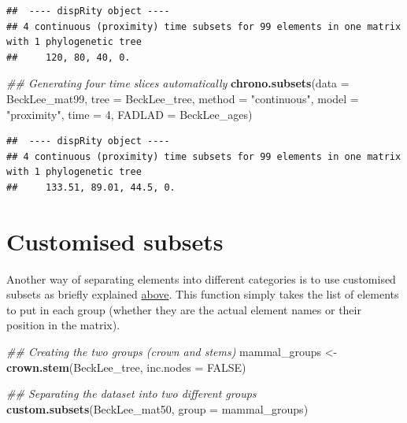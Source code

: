 \documentclass[
]{book}
\newenvironment{Shaded}{\begin{snugshade}}{\end{snugshade}}
\newcommand{\CommentTok}[1]{\textcolor[rgb]{0.56,0.35,0.01}{\textit{#1}}}
\newcommand{\DataTypeTok}[1]{\textcolor[rgb]{0.13,0.29,0.53}{#1}}
\newcommand{\DecValTok}[1]{\textcolor[rgb]{0.00,0.00,0.81}{#1}}
\newcommand{\KeywordTok}[1]{\textcolor[rgb]{0.13,0.29,0.53}{\textbf{#1}}}
\newcommand{\NormalTok}[1]{#1}
\newcommand{\OtherTok}[1]{\textcolor[rgb]{0.56,0.35,0.01}{#1}}
\newcommand{\StringTok}[1]{\textcolor[rgb]{0.31,0.60,0.02}{#1}}
\begin{document}
\begin{verbatim}
##  ---- dispRity object ---- 
## 4 continuous (proximity) time subsets for 99 elements in one matrix with 1 phylogenetic tree
##     120, 80, 40, 0.
\end{verbatim}

\begin{Shaded}
\begin{Highlighting}[]
\CommentTok{\#\# Generating four time slices automatically}
\KeywordTok{chrono.subsets}\NormalTok{(}\DataTypeTok{data =}\NormalTok{ BeckLee\_mat99, }\DataTypeTok{tree =}\NormalTok{ BeckLee\_tree,}
               \DataTypeTok{method =} \StringTok{"continuous"}\NormalTok{, }\DataTypeTok{model =} \StringTok{"proximity"}\NormalTok{,}
               \DataTypeTok{time =} \DecValTok{4}\NormalTok{, }\DataTypeTok{FADLAD =}\NormalTok{ BeckLee\_ages)}
\end{Highlighting}
\end{Shaded}

\begin{verbatim}
##  ---- dispRity object ---- 
## 4 continuous (proximity) time subsets for 99 elements in one matrix with 1 phylogenetic tree
##     133.51, 89.01, 44.5, 0.
\end{verbatim}

\hypertarget{custom-subsets}{%
\section{Customised subsets}\label{custom-subsets}}

Another way of separating elements into different categories is to use customised subsets as briefly explained \protect\hyperlink{disparity-among-groups}{above}.
This function simply takes the list of elements to put in each group (whether they are the actual element names or their position in the matrix).

\begin{Shaded}
\begin{Highlighting}[]
\CommentTok{\#\# Creating the two groups (crown and stems)}
\NormalTok{mammal\_groups \textless{}{-}}\StringTok{ }\KeywordTok{crown.stem}\NormalTok{(BeckLee\_tree, }\DataTypeTok{inc.nodes =} \OtherTok{FALSE}\NormalTok{)}

\CommentTok{\#\# Separating the dataset into two different groups}
\KeywordTok{custom.subsets}\NormalTok{(BeckLee\_mat50, }\DataTypeTok{group =}\NormalTok{ mammal\_groups)}
\end{Highlighting}
\end{Shaded}
\end{document}
